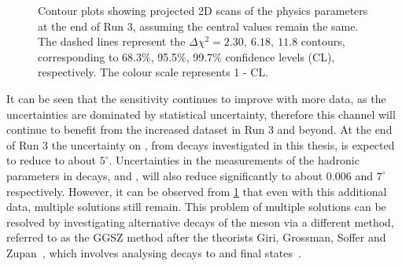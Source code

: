 \begin{figure}[h]
\centering
{}
\caption{Contour plots showing projected 2D scans of the physics parameters at the end of Run 3, assuming the central values remain the same. The dashed lines represent the $\Delta \chi^2 = 2.30,\ 6.18,\ 11.8$ contours, corresponding to 68.3\%, 95.5\%, 99.7\% confidence levels (CL), respectively. The colour scale represents 1 - CL.}
\label{gammadiniplotsrun3}
\end{figure}

It can be seen that the sensitivity continues to improve with more data, as the uncertainties are dominated by statistical uncertainty, therefore this channel will continue to benefit from the increased dataset in Run 3 and beyond. At the end of Run 3 the uncertainty on \Pgamma, from \btodkst decays investigated in this thesis, is expected to reduce to about $5^{\circ}$. Uncertainties in the measurements of the hadronic parameters in \btodkst decays, \rb and \deltab, will also reduce significantly to about $0.006$ and $7^{\circ}$ respectively. However, it can be observed from \fig\ref{gammadiniplotsrun3} that even with this additional data, multiple solutions still remain. This problem of multiple solutions can be resolved by investigating alternative decays of the \Dz meson via a different method, referred to as the GGSZ method after the theorists Giri, Grossman, Soffer and Zupan~\cite{GGSZ}, which involves analysing \Dz decays to \KS\pip\pim and \KS\Kp\Km final states~\cite{LHCb-PAPER-2012-027,LHCb-PAPER-2014-041}.

